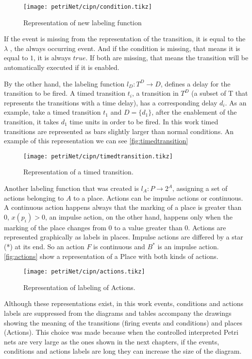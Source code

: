 \begin{figure}[H]
  \centering \texttt{[image: petriNet/cipn/condition.tikz]}
  \caption{Representation of new labeling function}
  \label{fig:condition}
\end{figure}

If the event is missing from the representation of the transition, it is equal
to the $\lambda$
, the always occurring event. And if the condition is missing, that means it is
equal to $1$, it is always $true$. If both are missing, that means the
transition will be automatically executed if it is enabled. 

By the other hand, the labeling function $l_D : T^D \rightarrow D$, defines a delay for the
transition to be fired. A timed transition $t_i$, a transition in $T^D$ (a subset of T
that represents the transitions with a time delay), has a corresponding delay
$d_i$. As an example, take a timed transition $t_1$ and $D=\{d_1\}$, after the
enablement of the transition, it takes $d_1$ time units in order to be fired. In
this work timed transitions are represented as bars slightly larger than normal
conditions. An example of this representation we can see \autoref{fig:timedtransition}

\begin{figure}[H]
  \centering \texttt{[image: petriNet/cipn/timedtransition.tikz]}
  \caption{Representation of a timed transition.}
  \label{fig:timedtransition}
\end{figure}
Another labeling function that was created is $l_A : P\rightarrow 2^A$,
assigning a set of actions belonging to $A$ to a place. Actions can be impulse actions or continuous. A
continuous action happens always that the marking of a place is greater than 0,
$x(p_i)>0$, an impulse action, on the other hand, happens only when the marking of
the place changes from 0 to a value greater than 0. 
Actions are represented graphically as labels in places. Impulse actions are differed by a star (*) at its end. So an action $F$ is
continuous and $B^*$ is an impulse action. 
\autoref{fig:actions} show a representation of a Place with both kinds of actions.
\begin{figure}[H]
  \centering \texttt{[image: petriNet/cipn/actions.tikz]}
  \caption{Representation of labeling of Actions.}
  \label{fig:actions}
\end{figure}

Although these representations exist, in this work events, conditions and
actions labels are suppressed from the diagrams and tables accompany the drawings
showing the meaning of the transitions (firing events and conditions) and places
(Actions). This choice was made because when the controlled interpreted Petri nets
are very
large as the ones shown in the next chapters, if the events, conditions and
actions labels are long they can increase the size of the
diagram.

